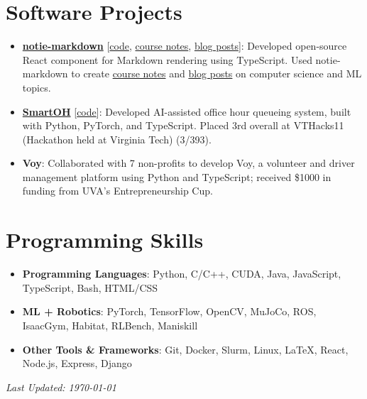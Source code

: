 \documentclass[letterpaper,11pt]{article}
\newcommand{\linkhref}[2]{\textcolor{linkblue}{\href{#1}{#2}}}
\begin{document}
\section{Software Projects}
\begin{itemize}[label={}, leftmargin=0pt]
  \item \textbf{\href{https://notie-markdown.vercel.app/}{notie-markdown}} [\linkhref{https://notie-markdown.vercel.app/}{code}, \linkhref{https://www.brandonyifanyang.com/notes}{course notes}, \linkhref{https://www.brandonyifanyang.com/blog}{blog posts}]: Developed open-source React component for Markdown rendering using TypeScript. Used notie-markdown to create \href{https://www.brandonyifanyang.com/notes}{course notes} and \href{https://www.brandonyifanyang.com/blog}{blog posts} on computer science and ML topics.
  \item \textbf{\href{https://github.com/ewei2406/SmartOH}{SmartOH}} [\linkhref{https://github.com/ewei2406/SmartOH}{code}]: Developed AI-assisted office hour queueing system, built with Python, PyTorch, and TypeScript. Placed 3rd overall at VTHacks11 (Hackathon held at Virginia Tech) (3/393).
  \item \textbf{Voy}: Collaborated with 7 non-profits to develop Voy, a volunteer and driver management platform using Python and TypeScript; received \$1000 in funding from UVA's Entrepreneurship Cup.
\end{itemize}

\section{Programming Skills}
\begin{itemize}[label={}, leftmargin=0pt]
  \item \textbf{Programming Languages}: Python, C/C++, CUDA, Java, JavaScript, TypeScript, Bash, HTML/CSS
  \item \textbf{ML + Robotics}: PyTorch, TensorFlow, OpenCV, MuJoCo, ROS, IsaacGym, Habitat, RLBench, Maniskill
  \item \textbf{Other Tools \& Frameworks}: Git, Docker, Slurm, Linux, \LaTeX, React, Node.js, Express, Django
\end{itemize}

\vfill
\noindent\textit{\small Last Updated: \today}
\end{document}
